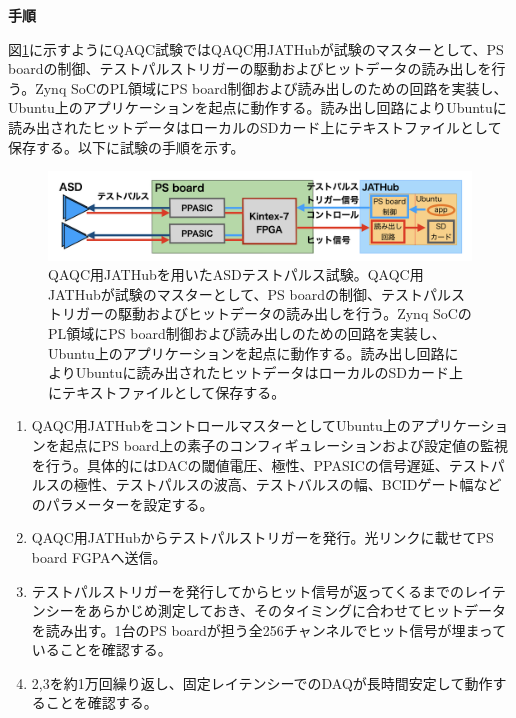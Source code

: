 \textbf{手順}\par
図\ref{QAQCasdtp}に示すようにQAQC試験ではQAQC用JATHubが試験のマスターとして、PS boardの制御、テストパルストリガーの駆動およびヒットデータの読み出しを行う。Zynq SoCのPL領域にPS board制御および読み出しのための回路を実装し、Ubuntu上のアプリケーションを起点に動作する。読み出し回路によりUbuntuに読み出されたヒットデータはローカルのSDカード上にテキストファイルとして保存する。以下に試験の手順を示す。

\begin{figure} 
\centering
\includegraphics[width=16cm]{fig/QAQC/QAQCasdtp.png}
\caption[QAQC用JATHubを用いたASDテストパルス試験]{QAQC用JATHubを用いたASDテストパルス試験。QAQC用JATHubが試験のマスターとして、PS boardの制御、テストパルストリガーの駆動およびヒットデータの読み出しを行う。Zynq SoCのPL領域にPS board制御および読み出しのための回路を実装し、Ubuntu上のアプリケーションを起点に動作する。読み出し回路によりUbuntuに読み出されたヒットデータはローカルのSDカード上にテキストファイルとして保存する。}
\label{QAQCasdtp}
\end{figure}

\begin{enumerate}
    \item QAQC用JATHubをコントロールマスターとしてUbuntu上のアプリケーションを起点にPS board上の素子のコンフィギュレーションおよび設定値の監視を行う。具体的にはDACの閾値電圧、極性、PPASICの信号遅延、テストパルスの極性、テストパルスの波高、テストバルスの幅、BCIDゲート幅などのパラメーターを設定する。
    \baselineskip

    \item QAQC用JATHubからテストパルストリガーを発行。光リンクに載せてPS board FGPAへ送信。
    \baselineskip

    \item テストパルストリガーを発行してからヒット信号が返ってくるまでのレイテンシーをあらかじめ測定しておき、そのタイミングに合わせてヒットデータを読み出す。1台のPS boardが担う全256チャンネルでヒット信号が埋まっていることを確認する。
    \baselineskip

    \item 2,3を約1万回繰り返し、固定レイテンシーでのDAQが長時間安定して動作することを確認する。
\end{enumerate}

